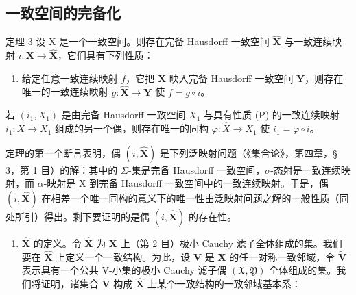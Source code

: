 \subsection{一致空间的完备化}

定理 3 设 X 是一个一致空间。则存在完备 Hausdorff 一致空间 \(\hat{\mathbf{X}}\) 与一致连续映射 \(i: \mathbf{X} \to \hat{\mathbf{X}}\)，它们具有下列性质：

\begin{enumerate}
\def\labelenumi{(\Alph{enumi})}
\setcounter{enumi}{15}
\tightlist
\item
  给定任意一致连续映射 \(f\)，它把 \(\mathbf{X}\) 映入完备 Hausdorff 一致空间 \(\mathbf{Y}\)，则存在唯一的一致连续映射 \(g: \hat{\mathbf{X}} \to \mathbf{Y}\) 使 \(f = g \circ i\)。
\end{enumerate}

若 \((i_1, X_1)\) 是由完备 Hausdorff 一致空间 \(X_1\) 与具有性质 (P) 的一致连续映射 \(i_1: X \to X_1\) 组成的另一个偶，则存在唯一的同构 \(\varphi: \hat{X} \to X_1\) 使 \(i_1 = \varphi \circ i\)。

定理的第一个断言表明，偶 \((i, \hat{\mathbf{X}})\) 是下列泛映射问题（《集合论》，第四章，§ 3，第 1 目）的解：其中的 \(\Sigma\)-集是完备 Hausdorff 一致空间，\(\sigma\)-态射是一致连续映射，而 \(\alpha\)-映射是 X 到完备 Hausdorff 一致空间中的一致连续映射。于是，偶 \((i, \hat{\mathbf{X}})\) 在相差一个唯一同构的意义下的唯一性由泛映射问题之解的一般性质（同处所引）得出。剩下要证明的是偶 \((i, \hat{\mathbf{X}})\) 的存在性。

\begin{enumerate}
\def\labelenumi{\arabic{enumi})}
\tightlist
\item
  \(\hat{\mathbf{X}}\) 的定义。令 \(\hat{\mathbf{X}}\) 为 \(\mathbf{X}\) 上（第 2 目）极小 Cauchy 滤子全体组成的集。我们要在 \(\hat{\mathbf{X}}\) 上定义一个一致结构。为此，设 \(\mathbf{V}\) 是 \(\mathbf{X}\) 的任一对称一致邻域，令 \(\tilde{\mathbf{V}}\) 表示具有一个公共 V-小集的极小 Cauchy 滤子偶 \((\mathfrak{X}, \mathfrak{Y})\) 全体组成的集。我们将证明，诸集合 \(\tilde{\mathbf{V}}\) 构成 \(\hat{\mathbf{X}}\) 上某个一致结构的一致邻域基本系：
\end{enumerate}

